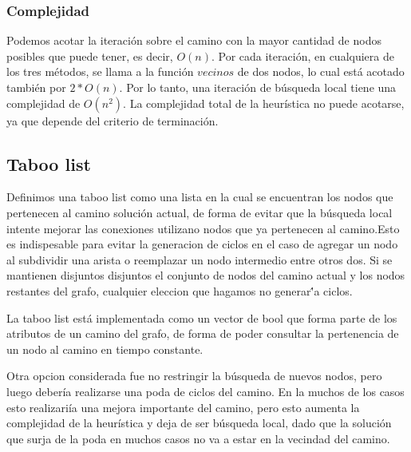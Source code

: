 \subsubsection{Complejidad}

Podemos acotar la iteraci\'on sobre el camino con la mayor cantidad de nodos posibles que puede tener, es decir, $O(n)$. Por cada iteraci\'on, en cualquiera de los tres m\'etodos, se llama a la funci\'on $vecinos$ de dos nodos, lo cual est\'a acotado tambi\'en por $2*O(n)$. Por lo tanto, una iteraci\'on de b\'usqueda local tiene una complejidad de $O(n^2)$. La complejidad total de la heur\'istica no puede acotarse, ya que depende del criterio de terminaci\'on.

\subsection{Taboo list}
  Definimos una taboo list como una lista en la cual se encuentran los nodos que pertenecen al camino soluci\'on actual, de forma de evitar que la b\'usqueda local intente mejorar las conexiones utilizano nodos que ya pertenecen al camino.Esto es indispesable para evitar la generacion de ciclos en el caso de agregar un nodo al subdividir una arista o reemplazar un nodo
intermedio entre otros dos. Si se mantienen disjuntos disjuntos el conjunto de nodos del camino actual y los nodos restantes del grafo, cualquier eleccion que hagamos no generar\''a ciclos.

\vspace{2mm}

La taboo list est\'a implementada como un vector de bool que forma parte de los atributos de un camino del grafo, de forma de poder consultar la pertenencia de un nodo al camino en tiempo constante.

\vspace{2mm}

	Otra opcion considerada fue no restringir la b\'usqueda de nuevos nodos, pero luego deber\'ia realizarse una poda de ciclos del camino. En la muchos de los casos esto realizari\'ia una mejora importante del camino, pero esto aumenta la complejidad de la heur\'istica y deja de ser b\'usqueda local, dado que la soluci\'on que surja de la poda en muchos casos no va a estar en la vecindad del camino.
 